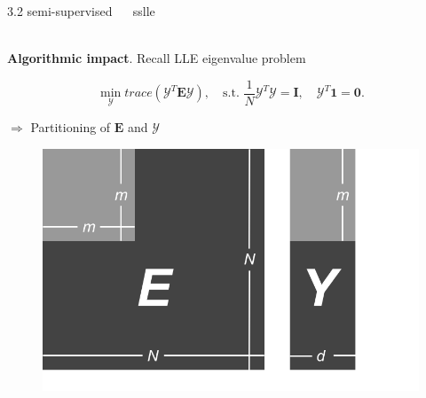 \documentclass[11pt, compress, t, notes = noshow, xcolor = table, 
aspectratio = 1610]{beamer}
\newcommand{\Y}{\mathcal{Y}}
\newcommand{\E}{\bm{E}}
\newcommand{\I}{\bm{I}}
\begin{document}
\begin{frame}{\textcolor{gray!90}{3.2 semi-supervised} ~~ sslle}
\begin{minipage}[t]{0.6\textwidth}
\phantom{foo} \\
\textbf{Algorithmic impact}. Recall LLE eigenvalue problem
\begin{fleqn}
  \begin{equation*}
    \min_{\Y} \mathit{trace}(\Y^T \E \Y), \quad
    \text{s.t. } \frac{1}{N} \Y^T \Y = \I, \quad
    \Y^T\bm{1} = \bm{0}.
  \end{equation*}
\end{fleqn}
$\Rightarrow$ Partitioning of $\E$ and $\Y$ \\
\end{minipage}%
\begin{minipage}[t]{0.05\textwidth}
  \phantom{foo}
\end{minipage}%
\begin{minipage}[t]{0.35\textwidth}
  \begin{figure}[H]
    \includegraphics[trim = 0 0 0 -15, clip, %
      width = 1.1\textwidth]{figures/matrix_partition}
  \end{figure}
\end{minipage}

\end{frame}

\end{document}
